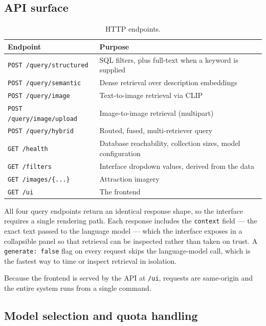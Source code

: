 \documentclass[11pt,a4paper]{article}
\begin{document}
\subsection{API surface}

\begin{table}[h]
\centering
\small
\begin{tabular}{lp{8.4cm}}
\toprule
\textbf{Endpoint} & \textbf{Purpose} \\
\midrule
\texttt{POST /query/structured}    & SQL filters, plus full-text when a keyword is supplied \\
\texttt{POST /query/semantic}      & Dense retrieval over description embeddings \\
\texttt{POST /query/image}         & Text-to-image retrieval via CLIP \\
\texttt{POST /query/image/upload}  & Image-to-image retrieval (multipart) \\
\texttt{POST /query/hybrid}        & Routed, fused, multi-retriever query \\
\texttt{GET /health}               & Database reachability, collection sizes, model configuration \\
\texttt{GET /filters}              & Interface dropdown values, derived from the data \\
\texttt{GET /images/\{...\}}       & Attraction imagery \\
\texttt{GET /ui}                   & The frontend \\
\bottomrule
\end{tabular}
\caption{HTTP endpoints.}
\end{table}

All four query endpoints return an identical response shape, so the interface
requires a single rendering path. Each response includes the \texttt{context}
field --- the exact text passed to the language model --- which the interface
exposes in a collapsible panel so that retrieval can be inspected rather than
taken on trust. A \texttt{generate: false} flag on every request skips the
language-model call, which is the fastest way to time or inspect retrieval in
isolation.

Because the frontend is served by the API at \texttt{/ui}, requests are
same-origin and the entire system runs from a single command.

\subsection{Model selection and quota handling}
\end{document}

